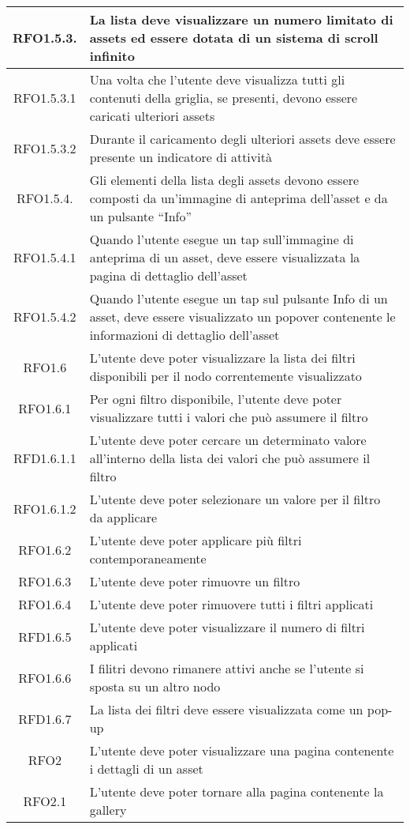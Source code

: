 \begin{longtable}{|c|m{10cm}|}
RFO1.5.3. & La lista deve visualizzare un numero limitato di assets ed essere dotata di un sistema di scroll infinito \\ \hline
RFO1.5.3.1 & Una volta che l'utente deve visualizza tutti gli contenuti della griglia, se presenti, devono essere caricati ulteriori assets \\ \hline
RFO1.5.3.2 & Durante il caricamento degli ulteriori assets deve essere presente un indicatore di attività \\ \hline
RFO1.5.4. & Gli elementi della lista degli assets devono essere composti da un'immagine di anteprima dell'asset e da un pulsante ``Info'' \\ \hline
RFO1.5.4.1 & Quando l'utente esegue un tap sull'immagine di anteprima di un asset, deve essere visualizzata la pagina di dettaglio dell'asset \\ \hline
RFO1.5.4.2 & Quando l'utente esegue un tap sul pulsante Info di un asset, deve essere visualizzato un popover contenente le informazioni di dettaglio dell'asset \\ \hline
RFO1.6 & L'utente deve poter visualizzare la lista dei filtri disponibili per il nodo correntemente visualizzato \\ \hline
RFO1.6.1 & Per ogni filtro disponibile, l'utente deve poter visualizzare tutti i valori che può assumere il filtro \\ \hline
RFD1.6.1.1 & L'utente deve poter cercare un determinato valore all'interno della lista dei valori che può assumere il filtro \\ \hline
RFO1.6.1.2 & L'utente deve poter selezionare un valore per il filtro da applicare \\ \hline
RFO1.6.2 & L'utente deve poter applicare più filtri contemporaneamente \\ \hline
RFO1.6.3 & L'utente deve poter rimuovre un filtro \\ \hline
RFO1.6.4 & L'utente deve poter rimuovere tutti i filtri applicati \\ \hline
RFD1.6.5 & L'utente deve poter visualizzare il numero di filtri applicati \\ \hline
RFO1.6.6 & I filitri devono rimanere attivi anche se l'utente si sposta su un altro nodo \\ \hline
RFD1.6.7 & La lista dei filtri deve essere visualizzata come un pop-up \\ \hline
RFO2 & L'utente deve poter visualizzare una pagina contenente i dettagli di un asset \\ \hline
RFO2.1 & L'utente deve poter tornare alla pagina contenente la gallery \\ \hline

\end{longtable}
